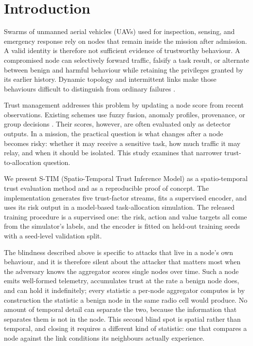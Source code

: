 \documentclass[notspecified,article,submit,moreauthors]{Definitions/mdpi}
\begin{document}
\section{Introduction}
Swarms of unmanned aerial vehicles (UAVs) used for inspection, sensing, and emergency response rely on nodes that remain inside the mission after admission. A valid identity is therefore not sufficient evidence of trustworthy behaviour. A compromised node can selectively forward traffic, falsify a task result, or alternate between benign and harmful behaviour while retaining the privileges granted by its earlier history. Dynamic topology and intermittent links make those behaviours difficult to distinguish from ordinary failures \cite{kundu2024survey,noor2020fanet}.

Trust management addresses this problem by updating a node score from recent observations. Existing schemes use fuzzy fusion, anomaly profiles, provenance, or group decisions \cite{benfriha2024fuba,akram2024galtrust,ge2021uavpro,hu2025gdm}. Their scores, however, are often evaluated only as detector outputs. In a mission, the practical question is what changes after a node becomes risky: whether it may receive a sensitive task, how much traffic it may relay, and when it should be isolated. This study examines that narrower trust-to-allocation question.

We present S-TIM (Spatio-Temporal Trust Inference Model) as a spatio-temporal trust evaluation method and as a reproducible proof of concept. The implementation generates five trust-factor streams, fits a supervised encoder, and uses its risk output in a model-based task-allocation simulation. The released training procedure is a supervised one: the risk, action and value targets all come from the simulator's labels, and the encoder is fitted on held-out training seeds with a seed-level validation split.

The blindness described above is specific to attacks that live in a node's own
behaviour, and it is therefore silent about the attacker that matters most when
the adversary knows the aggregator scores single nodes over time. Such a node
emits well-formed telemetry, accumulates trust at the rate a benign node does,
and can hold it indefinitely; every statistic a per-node aggregator computes is
by construction the statistic a benign node in the same radio cell would
produce. No amount of temporal detail can separate the two, because the
information that separates them is not in the node. This second blind spot is
spatial rather than temporal, and closing it requires a different kind of
statistic: one that compares a node against the link conditions its neighbours
actually experience.
\end{document}

